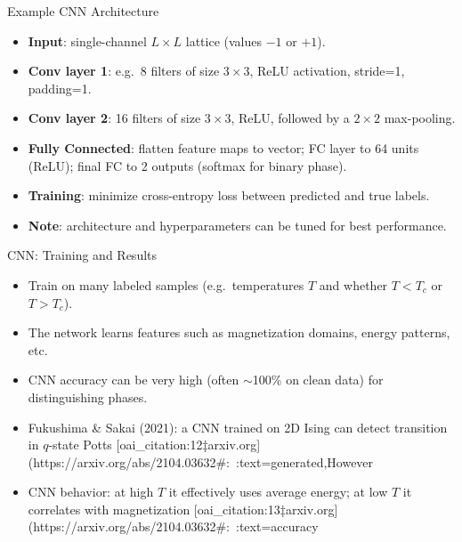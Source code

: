 \documentclass{beamer}
\begin{document}
\begin{frame}{Example CNN Architecture}
 \begin{itemize}
   \item \textbf{Input}: single-channel $L\times L$ lattice (values $-1$ or $+1$).
   \item \textbf{Conv layer 1}: e.g.\ 8 filters of size $3\times3$, ReLU activation, stride=1, padding=1.
   \item \textbf{Conv layer 2}: 16 filters of size $3\times3$, ReLU, followed by a $2\times2$ max-pooling.
   \item \textbf{Fully Connected}: flatten feature maps to vector; FC layer to 64 units (ReLU); final FC to 2 outputs (softmax for binary phase).
   \item \textbf{Training}: minimize cross-entropy loss between predicted and true labels.
   \item \textbf{Note}: architecture and hyperparameters can be tuned for best performance.
 \end{itemize}
\end{frame}

\begin{frame}{CNN: Training and Results}
 \begin{itemize}
   \item Train on many labeled samples (e.g.\ temperatures $T$ and whether $T<T_c$ or $T>T_c$).
   \item The network learns features such as magnetization domains, energy patterns, etc.
   \item CNN accuracy can be very high (often $\sim$100\% on clean data) for distinguishing phases.
   \item Fukushima \& Sakai (2021): a CNN trained on 2D Ising can detect transition in $q$-state Potts [oai_citation:12‡arxiv.org](https://arxiv.org/abs/2104.03632#:~:text=generated,However%
   \item CNN behavior: at high $T$ it effectively uses average energy; at low $T$ it correlates with magnetization [oai_citation:13‡arxiv.org](https://arxiv.org/abs/2104.03632#:~:text=accuracy%
 \end{itemize}
\end{frame}
\end{document}
